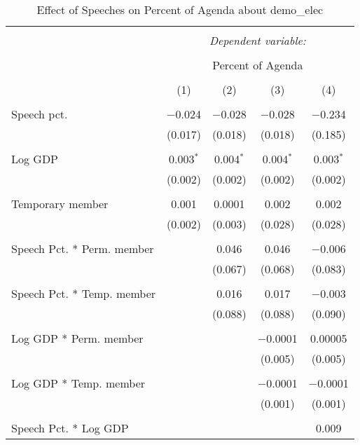 
\begin{table}[!htbp] \centering 
  \caption{Effect of Speeches on Percent of Agenda about  demo_elec} 
  \label{} 
\begin{tabular}{@{\extracolsep{5pt}}lcccc} 
\\[-1.8ex]\hline 
\hline \\[-1.8ex] 
 & \multicolumn{4}{c}{\textit{Dependent variable:}} \\ 
\cline{2-5} 
\\[-1.8ex] & \multicolumn{4}{c}{Percent of Agenda} \\ 
\\[-1.8ex] & (1) & (2) & (3) & (4)\\ 
\hline \\[-1.8ex] 
 Speech pct. & $-$0.024 & $-$0.028 & $-$0.028 & $-$0.234 \\ 
  & (0.017) & (0.018) & (0.018) & (0.185) \\ 
  & & & & \\ 
 Log GDP & 0.003$^{*}$ & 0.004$^{*}$ & 0.004$^{*}$ & 0.003$^{*}$ \\ 
  & (0.002) & (0.002) & (0.002) & (0.002) \\ 
  & & & & \\ 
 Temporary member & 0.001 & 0.0001 & 0.002 & 0.002 \\ 
  & (0.002) & (0.003) & (0.028) & (0.028) \\ 
  & & & & \\ 
 Speech Pct. * Perm. member &  & 0.046 & 0.046 & $-$0.006 \\ 
  &  & (0.067) & (0.068) & (0.083) \\ 
  & & & & \\ 
 Speech Pct. * Temp. member &  & 0.016 & 0.017 & $-$0.003 \\ 
  &  & (0.088) & (0.088) & (0.090) \\ 
  & & & & \\ 
 Log GDP * Perm. member &  &  & $-$0.0001 & 0.00005 \\ 
  &  &  & (0.005) & (0.005) \\ 
  & & & & \\ 
 Log GDP * Temp. member &  &  & $-$0.0001 & $-$0.0001 \\ 
  &  &  & (0.001) & (0.001) \\ 
  & & & & \\ 
 Speech Pct. * Log GDP &  &  &  & 0.009 \\ 

\end{tabular}
\end{table}
